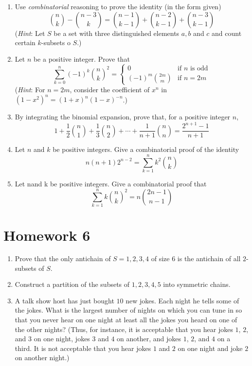 \documentclass{report}
\begin{document}
{\begin{enumerate}
    \item Use \textit{combinatorial} reasoning to prove the identity (in the form given)
          $$\binom{n}{k} - \binom{n-3}{k} = \binom{n-1}{k-1} + \binom{n-2}{k-1}+\binom{n-3}{k-1}$$
          (\textit{Hint}: Let $S$ be a set with three distinguished elements $a,b$ and $c$ and count certain
          $k$-subsets o $S$.)

    \item Let $n$ be a positive integer. Prove that
          $$
              \sum_{k=0}^n (-1)^k \binom{n}{k}^2 = \begin{cases}
                  0                      & \text{if } n \text{ is odd} \\
                  (-1)^{m} \binom{2m}{m} & \text{if } n=2m
              \end{cases}
          $$
          (\textit{Hint}: For $n=2m$, consider the coefficient of $x^n$ in $(1-x^2)^n=(1+x)^n(1-x)^{-n}$.)\

    \item By integrating the binomial expansion, prove that, for a positive integer $n$,
          $$1 + \frac{1}{2}\binom{n}{1} + \frac{1}{3}\binom{n}{2} + \cdots + \frac{1}{n+1}\binom{n}{n} = \frac{2^{n+1}-1}{n+1}$$

    \item Let $n$ and $k$ be positive integers. Give a combinatorial proof of the identity
          $$n(n+1)2^{n-2} = \sum_{k=1}^{n}k^2\binom{n}{k}$$

    \item Let nand k be positive integers. Give a combinatorial proof that
          $$\sum_{k=1}^{n} k \binom{n}{k}^2 = n \binom{2n-1}{n-1}$$
\end{enumerate}

\section{Homework 6}

\begin{enumerate}
    \item Prove that the only antichain of $S = {1, 2, 3, 4}$ of size $6$ is the antichain of all
          $2$-subsets of $S$.

    \item Construct a partition of the subsets of ${1, 2, 3, 4, 5}$ into symmetric chains.

    \item A talk show host has just bought $10$ new jokes. Each night he tells some of the
          jokes. What is the largest number of nights on which you can tune in so that
          you never hear on one night at least all the jokes you heard on one of the other
          nights? (Thus, for instance, it is acceptable that you hear jokes $1$, $2$, and $3$ on
          one night, jokes $3$ and $4$ on another, and jokes $1$, $2$, and $4$ on a third. It is not
          acceptable that you hear jokes $1$ and $2$ on one night and joke $2$ on another night.)


\end{enumerate}}
\end{document}
